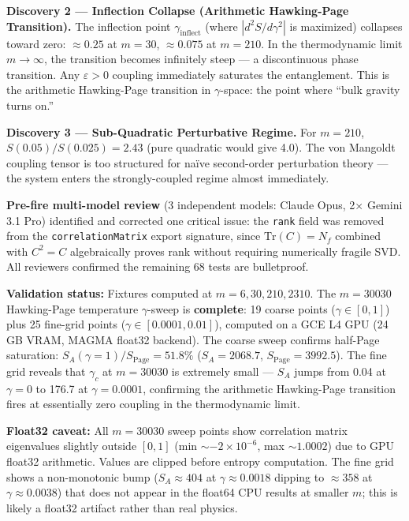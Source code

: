 \documentclass[
  11pt,
]{article}
\numberwithin{equation}{section}
\begin{document}
\textbf{Discovery 2 --- Inflection Collapse (Arithmetic Hawking-Page
Transition).} The inflection point \(\gamma_{\text{inflect}}\) (where
\(|d^2 S/d\gamma^2|\) is maximized) collapses toward zero:
\(\approx 0.25\) at \(m=30\), \(\approx 0.075\) at \(m=210\). In the
thermodynamic limit \(m \to \infty\), the transition becomes infinitely
steep --- a discontinuous phase transition. Any \(\varepsilon > 0\)
coupling immediately saturates the entanglement. This is the arithmetic
Hawking-Page transition in \(\gamma\)-space: the point where ``bulk
gravity turns on.''

\textbf{Discovery 3 --- Sub-Quadratic Perturbative Regime.} For
\(m=210\), \(S(0.05)/S(0.025) = 2.43\) (pure quadratic would give 4.0).
The von Mangoldt coupling tensor is too structured for naïve
second-order perturbation theory --- the system enters the
strongly-coupled regime almost immediately.

\textbf{Pre-fire multi-model review} (3 independent models: Claude Opus,
2× Gemini 3.1 Pro) identified and corrected one critical issue: the
\texttt{rank} field was removed from the \texttt{correlationMatrix}
export signature, since \(\text{Tr}(C) = N_f\) combined with \(C^2 = C\)
algebraically proves rank without requiring numerically fragile SVD. All
reviewers confirmed the remaining 68 tests are bulletproof.

\textbf{Validation status:} Fixtures computed at
\(m = 6, 30, 210, 2310\). The \(m = 30030\) Hawking-Page temperature
\(\gamma\)-sweep is \textbf{complete}: 19 coarse points
(\(\gamma \in [0, 1]\)) plus 25 fine-grid points
(\(\gamma \in [0.0001, 0.01]\)), computed on a GCE L4 GPU (24 GB VRAM,
MAGMA float32 backend). The coarse sweep confirms half-Page saturation:
\(S_A(\gamma=1) / S_{\text{Page}} = 51.8\%\) (\(S_A = 2068.7\),
\(S_{\text{Page}} = 3992.5\)). The fine grid reveals that \(\gamma_c\)
at \(m = 30030\) is extremely small --- \(S_A\) jumps from 0.04 at
\(\gamma = 0\) to 176.7 at \(\gamma = 0.0001\), confirming the
arithmetic Hawking-Page transition fires at essentially zero coupling in
the thermodynamic limit.

\textbf{Float32 caveat:} All \(m = 30030\) sweep points show correlation
matrix eigenvalues slightly outside \([0, 1]\) (min
\(\sim -2 \times 10^{-6}\), max \(\sim 1.0002\)) due to GPU float32
arithmetic. Values are clipped before entropy computation. The fine grid
shows a non-monotonic bump (\(S_A \approx 404\) at
\(\gamma \approx 0.0018\) dipping to \(\approx 358\) at
\(\gamma \approx 0.0038\)) that does not appear in the float64 CPU
results at smaller \(m\); this is likely a float32 artifact rather than
real physics.
\end{document}
